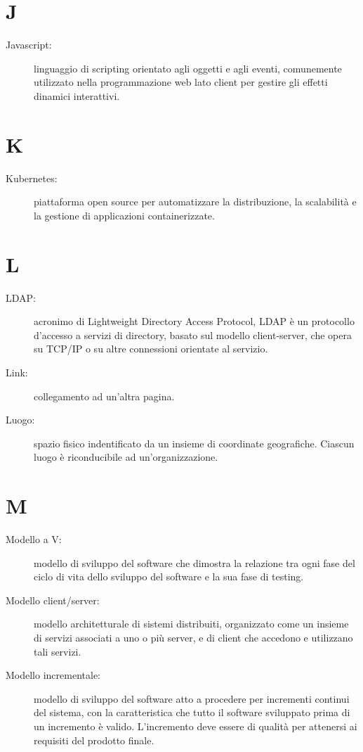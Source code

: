 \documentclass{article}
\begin{document}
	\section{J}
	\begin{description}
		\item[Javascript:] linguaggio di scripting orientato agli oggetti e agli eventi, comunemente utilizzato nella programmazione web lato client per gestire gli effetti dinamici interattivi.
	\end{description}
	\newpage
	\section{K}
	\begin{description}
		\item[Kubernetes:] piattaforma open source per automatizzare la distribuzione, la scalabilità e la gestione di applicazioni containerizzate.
	\end{description}
	\newpage
	\section{L}
	\begin{description}
		\item[LDAP:] acronimo di Lightweight Directory Access Protocol, LDAP è un protocollo d'accesso a servizi di directory, basato sul modello client-server, che opera su TCP/IP o su altre connessioni orientate al servizio.
		\item[Link:] collegamento ad un'altra pagina.
		\item[Luogo:] spazio fisico indentificato da un insieme di coordinate geografiche. Ciascun luogo è riconducibile ad un'organizzazione.
	\end{description}
	\newpage
	\section{M}
	\begin{description}
		\item[Modello a V:] modello di sviluppo del software che dimostra la relazione tra ogni fase del ciclo di vita dello sviluppo del software e la sua fase di testing.
		\item[Modello client/server:] modello architetturale di sistemi distribuiti, organizzato come un insieme di servizi associati a uno o più server, e di client che accedono e utilizzano tali servizi.
		\item[Modello incrementale:] modello di sviluppo del software atto a procedere per incrementi continui del sistema, con la caratteristica che tutto il software sviluppato prima di un incremento è valido. L'incremento deve essere di qualità per attenersi ai requisiti del prodotto finale.
	\end{description}
	\newpage
\end{document}
